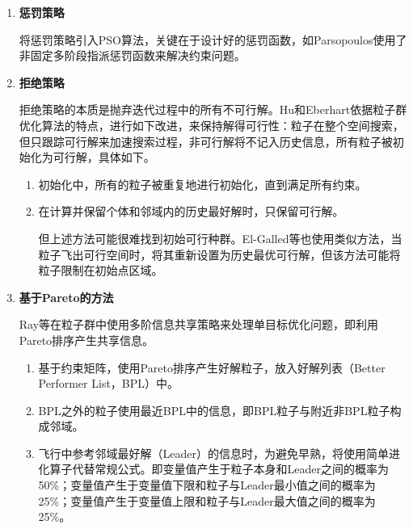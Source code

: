\begin{enumerate}
	\item \textbf{惩罚策略}
	
	将惩罚策略引入PSO算法，关键在于设计好的惩罚函数，如Parsopoulos使用了非固定多阶段指派惩罚函数来解决约束问题\cite{Parsopoulos2001Improving}\cite{Parsopoulos2002Recent}。
	\item \textbf{拒绝策略}
	
	拒绝策略的本质是抛弃迭代过程中的所有不可行解。Hu和Eberhart依据粒子群优化算法的特点，进行如下改进，来保持解得可行性：粒子在整个空间搜索，但只跟踪可行解来加速搜索过程，非可行解将不记入历史信息，所有粒子被初始化为可行解，具体如下。
	
	\begin{enumerate}
		\item 初始化中，所有的粒子被重复地进行初始化，直到满足所有约束。
		\item 在计算并保留个体和邻域内的历史最好解时，只保留可行解。
		
		但上述方法可能很难找到初始可行种群。El-Galled等也使用类似方法\cite{El2002Enhancing}，当粒子飞出可行空间时，将其重新设置为历史最优可行解，但该方法可能将粒子限制在初始点区域。
	\end{enumerate}
\item \textbf{基于Pareto的方法}

Ray等在粒子群中使用多阶信息共享策略来处理单目标优化问题\cite{Ratnaweera2004Self}，即利用Pareto排序产生共享信息。
\begin{enumerate}
	\item 基于约束矩阵，使用Pareto排序产生好解粒子\cite{Lei2008A}，放入好解列表（Better Performer List，BPL）中。
	\item BPL之外的粒子使用最近BPL中的信息，即BPL粒子与附近非BPL粒子构成邻域。
	\item 飞行中参考邻域最好解（Leader）的信息时，为避免早熟，将使用简单进化算子代替常规公式。即变量值产生于粒子本身和Leader之间的概率为50\%；变量值产生于变量值下限和粒子与Leader最小值之间的概率为25\%；变量值产生于变量值上限和粒子与Leader最大值之间的概率为25\%。
\end{enumerate}
\end{enumerate}
